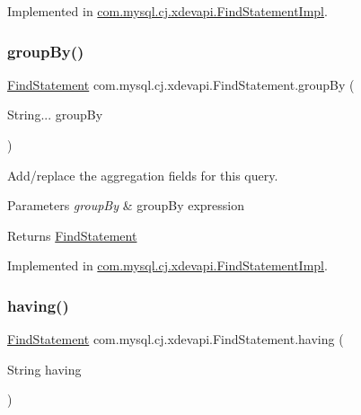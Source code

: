 Implemented in \mbox{\hyperlink{classcom_1_1mysql_1_1cj_1_1xdevapi_1_1_find_statement_impl_a52d3c488bb46564fdab7629781d6c99b}{com.\+mysql.\+cj.\+xdevapi.\+Find\+Statement\+Impl}}.

\mbox{\label{interfacecom_1_1mysql_1_1cj_1_1xdevapi_1_1_find_statement_a05535b09958e5196723d4eb8911f0360}} 
\subsubsection{\texorpdfstring{group\+By()}{groupBy()}}
{\footnotesize\ttfamily \mbox{\hyperlink{interfacecom_1_1mysql_1_1cj_1_1xdevapi_1_1_find_statement}{Find\+Statement}} com.\+mysql.\+cj.\+xdevapi.\+Find\+Statement.\+group\+By (\begin{DoxyParamCaption}\item[{String...}]{group\+By }\end{DoxyParamCaption})}

Add/replace the aggregation fields for this query.


\begin{DoxyParams}{Parameters}
{\em group\+By} & group\+By expression \\
\hline
\end{DoxyParams}
\begin{DoxyReturn}{Returns}
\mbox{\hyperlink{interfacecom_1_1mysql_1_1cj_1_1xdevapi_1_1_find_statement}{Find\+Statement}} 
\end{DoxyReturn}


Implemented in \mbox{\hyperlink{classcom_1_1mysql_1_1cj_1_1xdevapi_1_1_find_statement_impl_ad75d9465a8dec5c2340ab8b25678f97d}{com.\+mysql.\+cj.\+xdevapi.\+Find\+Statement\+Impl}}.

\mbox{\label{interfacecom_1_1mysql_1_1cj_1_1xdevapi_1_1_find_statement_af151c43e0c862bd983c6c737320a6a5f}} 
\subsubsection{\texorpdfstring{having()}{having()}}
{\footnotesize\ttfamily \mbox{\hyperlink{interfacecom_1_1mysql_1_1cj_1_1xdevapi_1_1_find_statement}{Find\+Statement}} com.\+mysql.\+cj.\+xdevapi.\+Find\+Statement.\+having (\begin{DoxyParamCaption}\item[{String}]{having }\end{DoxyParamCaption})}


